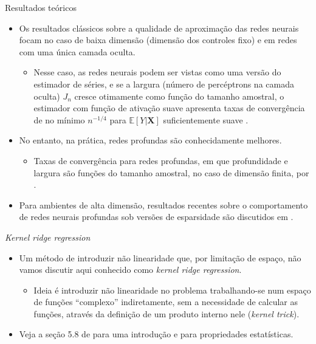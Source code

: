 \documentclass[11pt]{beamer}
\begin{document}
\begin{frame}{Resultados teóricos}
\begin{itemize}
	\item Os resultados clássicos sobre a qualidade de aproximação das redes neurais focam no caso de baixa dimensão (dimensão dos controles fixo) e em redes com uma única camada oculta.
	\begin{itemize}
		\item Nesse caso, as redes neurais podem ser vistas como uma versão do estimador de séries, e se a largura (número de percéptrons na camada oculta) $J_n$ cresce otimamente como função do tamanho amostral, o estimador com função de ativação suave apresenta taxas de convergência de no mínimo $n^{-1/4}$ para $\mathbb{E}[Y|\boldsymbol{X}]$ suficientemente suave \citep{Chen1999,chen2007}.
	\end{itemize}
	\item No entanto, na prática, redes profundas são conhecidamente melhores.
	\begin{itemize}
		\item Taxas de convergência para redes profundas, em que profundidade e largura são funções do tamanho amostral, no caso de dimensão finita, por \citep{Farrell2021}.
	\end{itemize}
	\item Para ambientes de alta dimensão, resultados recentes sobre o comportamento de redes neurais profundas sob versões de esparsidade são discutidos em \cite{chernozhukov2024appliedcausalinferencepowered}.
\end{itemize}
\end{frame}

\begin{frame}{\textit{Kernel ridge regression}}
\begin{itemize}
	\item Um método de introduzir não linearidade que, por limitação de espaço, não vamos discutir aqui  conhecido como \textit{kernel ridge regression}.
	\begin{itemize}
		\item Ideia é introduzir não linearidade no problema trabalhando-se num espaço de funções ``complexo'' indiretamente, sem a necessidade de calcular as funções, através da definição de um produto interno nele (\textit{kernel trick}).
		
	\end{itemize}
	\item Veja a seção 5.8 de \citet{hastie2009elements} para uma introdução e \citet{singh2023kernelridgeregressioninference} para propriedades estatísticas.
\end{itemize}
\end{frame}
\end{document}
